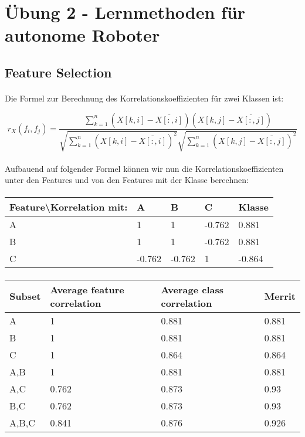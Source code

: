 \documentclass{article}
\begin{document}
\section*{Übung 2 - Lernmethoden für autonome Roboter}
\subsection{Feature Selection}
\paragraph{}
Die Formel zur Berechnung des Korrelationskoeffizienten für zwei Klassen ist:

\[
	r_X(f_i,f_j) = \frac{\sum \limits_{k=1}^{n} (X[k,i] - \overline{X[:,i]})(X[k,j] - \overline{X[:,j]})}{\sqrt{\sum \limits_{k=1}^{n} (X[k,i] - \overline{X[:,i]})^2} \sqrt{\sum \limits_{k=1}^{n} (X[k,j] - \overline{X[:,j]})^2 }}
\]

\paragraph{}
Aufbauend auf folgender Formel können wir nun die Korrelationskoeffizienten unter den Features und von den Features mit der Klasse berechnen:
\paragraph{}
\begin{tabular}{|l|l|l|l|l|}
	\hline
	Feature\textbackslash{}Korrelation mit: & A & B & C & Klasse \\\hline
	A & 1 & 1 & -0.762 & 0.881 \\\hline
	B & 1 & 1 & -0.762 & 0.881 \\\hline
	C & -0.762 & -0.762 & 1 & -0.864 \\\hline
\end{tabular}

\paragraph{}
\begin{tabular}{|l|l|l|l|}
	\hline
	Subset & Average feature correlation & Average class correlation & Merrit \\\hline
	{A} & 1 & 0.881 & 0.881 \\\hline
	{B} & 1 & 0.881 & 0.881 \\\hline
	{C} & 1 & 0.864 & 0.864 \\\hline
	{A,B} & 1 & 0.881 & 0.881 \\\hline
	{A,C} & 0.762 & 0.873 & 0.93 \\\hline
	{B,C} & 0.762 & 0.873 & 0.93 \\\hline
	{A,B,C} & 0.841 & 0.876 & 0.926 \\\hline
\end{tabular}
\end{document}

